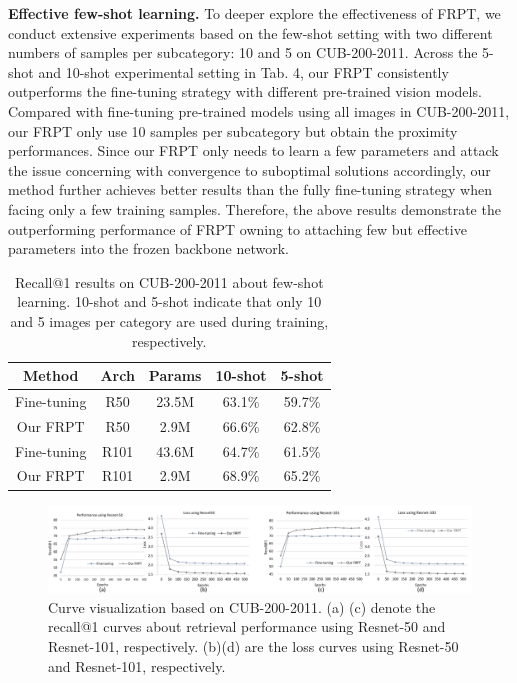 \documentclass[letterpaper]{article} %
\begin{document}
\textbf{Effective few-shot learning.} To deeper explore the effectiveness of FRPT, we conduct extensive experiments based on the few-shot setting with two different numbers of samples per subcategory: 10 and 5 on CUB-200-2011. Across the 5-shot and 10-shot experimental setting in Tab. 4, our FRPT consistently outperforms the fine-tuning strategy with different pre-trained vision models. Compared with fine-tuning pre-trained models using all images in CUB-200-2011, our FRPT only use 10 samples per subcategory but obtain the proximity performances. Since our FRPT only needs to learn a few parameters and attack the issue concerning with convergence to suboptimal solutions accordingly, our method further achieves better results than the fully fine-tuning strategy when facing only a few training samples. Therefore, the above results demonstrate the outperforming performance of FRPT owning to attaching few but effective parameters into the frozen backbone network.

\begin{table}\centering

	\begin{tabular}{c|c|c||c|c}
		\hline
		\hline
		Method & Arch & Params & 10-shot & 5-shot \\
		\hline
		\hline
		Fine-tuning & R50 &  23.5M  & 63.1\% & 59.7\%  \\
		Our FRPT & R50 &  2.9M  & 66.6\% &  62.8\%  \\
		Fine-tuning & R101 & 43.6M  & 64.7\%  & 61.5\% \\
		Our FRPT & R101 & 2.9M & 68.9\% & 65.2\% \\
		\hline
		\hline

\end{tabular}
	\caption{  Recall@1 results on CUB-200-2011 about few-shot learning. 10-shot and 5-shot indicate that only 10 and 5 images per category are used during training, respectively.
}
\end{table}

\begin{figure}[t]
\begin{center}
  \includegraphics[width=0.93\linewidth]{vce}
\end{center}
  \caption{Curve visualization based on CUB-200-2011. (a) (c) denote the recall@1 curves about retrieval performance using Resnet-50 and Resnet-101, respectively. (b)(d) are the loss curves using Resnet-50 and Resnet-101, respectively.
  }

\end{figure}
\end{document}
